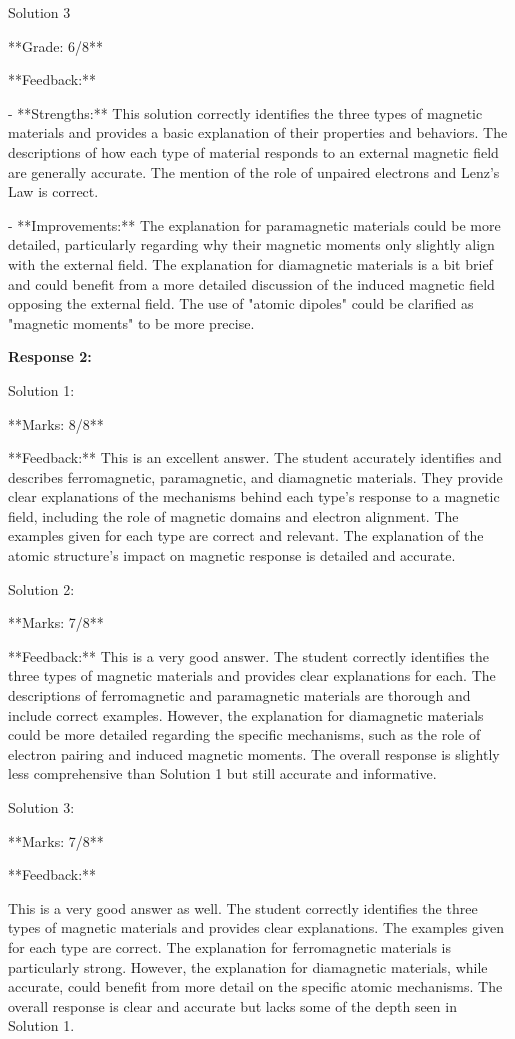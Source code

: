 \documentclass[a4paper,11pt]{article}
\begin{document}
Solution 3

**Grade: 6/8**

**Feedback:**

- **Strengths:** This solution correctly identifies the three types of magnetic materials and provides a basic explanation of their properties and behaviors. The descriptions of how each type of material responds to an external magnetic field are generally accurate. The mention of the role of unpaired electrons and Lenz's Law is correct.

- **Improvements:** The explanation for paramagnetic materials could be more detailed, particularly regarding why their magnetic moments only slightly align with the external field. The explanation for diamagnetic materials is a bit brief and could benefit from a more detailed discussion of the induced magnetic field opposing the external field. The use of "atomic dipoles" could be clarified as "magnetic moments" to be more precise.

\bigskip
\textbf{Response 2:}

Solution 1: 

**Marks: 8/8**

**Feedback:**
This is an excellent answer. The student accurately identifies and describes ferromagnetic, paramagnetic, and diamagnetic materials. They provide clear explanations of the mechanisms behind each type's response to a magnetic field, including the role of magnetic domains and electron alignment. The examples given for each type are correct and relevant. The explanation of the atomic structure's impact on magnetic response is detailed and accurate.

Solution 2: 

**Marks: 7/8**

**Feedback:**
This is a very good answer. The student correctly identifies the three types of magnetic materials and provides clear explanations for each. The descriptions of ferromagnetic and paramagnetic materials are thorough and include correct examples. However, the explanation for diamagnetic materials could be more detailed regarding the specific mechanisms, such as the role of electron pairing and induced magnetic moments. The overall response is slightly less comprehensive than Solution 1 but still accurate and informative.

Solution 3: 

**Marks: 7/8**

**Feedback:**

This is a very good answer as well. The student correctly identifies the three types of magnetic materials and provides clear explanations. The examples given for each type are correct. The explanation for ferromagnetic materials is particularly strong. However, the explanation for diamagnetic materials, while accurate, could benefit from more detail on the specific atomic mechanisms. The overall response is clear and accurate but lacks some of the depth seen in Solution 1.
\end{document}
